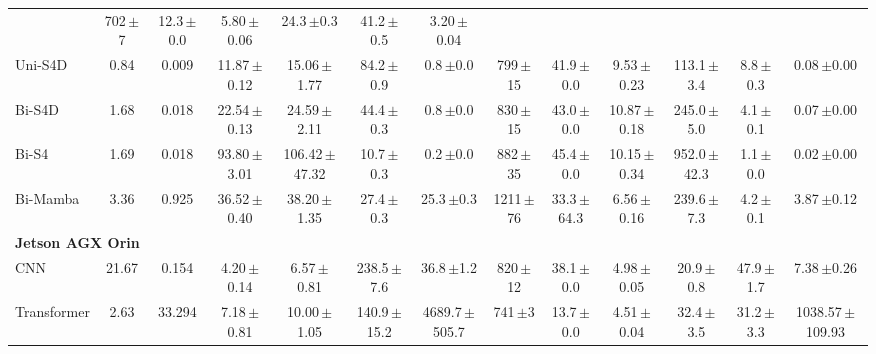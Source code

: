 \documentclass[sigconf,nonacm]{acmart}
\begin{document}
\begin{table}[t]
{\begin{tabular}{lcccccccccccc}
      & 702{\scriptsize\,$\pm$7} & 12.3{\scriptsize\,$\pm$0.0} & 5.80{\scriptsize\,$\pm$0.06}
      & 24.3{\scriptsize\,$\pm$0.3} & 41.2{\scriptsize\,$\pm$0.5} & 3.20{\scriptsize\,$\pm$0.04} \\
    Uni-S4D & 0.84 & 0.009
      & 11.87{\scriptsize\,$\pm$0.12} & 15.06{\scriptsize\,$\pm$1.77} & 84.2{\scriptsize\,$\pm$0.9} & 0.8{\scriptsize\,$\pm$0.0}
      & 799{\scriptsize\,$\pm$15} & 41.9{\scriptsize\,$\pm$0.0} & 9.53{\scriptsize\,$\pm$0.23}
      & 113.1{\scriptsize\,$\pm$3.4} & 8.8{\scriptsize\,$\pm$0.3} & 0.08{\scriptsize\,$\pm$0.00} \\
    Bi-S4D & 1.68 & 0.018
      & 22.54{\scriptsize\,$\pm$0.13} & 24.59{\scriptsize\,$\pm$2.11} & 44.4{\scriptsize\,$\pm$0.3} & 0.8{\scriptsize\,$\pm$0.0}
      & 830{\scriptsize\,$\pm$15} & 43.0{\scriptsize\,$\pm$0.0} & 10.87{\scriptsize\,$\pm$0.18}
      & 245.0{\scriptsize\,$\pm$5.0} & 4.1{\scriptsize\,$\pm$0.1} & 0.07{\scriptsize\,$\pm$0.00} \\
    Bi-S4 & 1.69 & 0.018
      & 93.80{\scriptsize\,$\pm$3.01} & 106.42{\scriptsize\,$\pm$47.32} & 10.7{\scriptsize\,$\pm$0.3} & 0.2{\scriptsize\,$\pm$0.0}
      & 882{\scriptsize\,$\pm$35} & 45.4{\scriptsize\,$\pm$0.0} & 10.15{\scriptsize\,$\pm$0.34}
      & 952.0{\scriptsize\,$\pm$42.3} & 1.1{\scriptsize\,$\pm$0.0} & 0.02{\scriptsize\,$\pm$0.00} \\
    Bi-Mamba & 3.36 & 0.925
      & 36.52{\scriptsize\,$\pm$0.40} & 38.20{\scriptsize\,$\pm$1.35} & 27.4{\scriptsize\,$\pm$0.3} & 25.3{\scriptsize\,$\pm$0.3}
      & 1211{\scriptsize\,$\pm$76} & 33.3{\scriptsize\,$\pm$64.3} & 6.56{\scriptsize\,$\pm$0.16}
      & 239.6{\scriptsize\,$\pm$7.3} & 4.2{\scriptsize\,$\pm$0.1} & 3.87{\scriptsize\,$\pm$0.12} \\
    \midrule
    \multicolumn{13}{l}{\textbf{Jetson AGX Orin}} \\
    CNN & 21.67 & 0.154
      & 4.20{\scriptsize\,$\pm$0.14} & 6.57{\scriptsize\,$\pm$0.81} & 238.5{\scriptsize\,$\pm$7.6} & 36.8{\scriptsize\,$\pm$1.2}
      & 820{\scriptsize\,$\pm$12} & 38.1{\scriptsize\,$\pm$0.0} & 4.98{\scriptsize\,$\pm$0.05}
      & 20.9{\scriptsize\,$\pm$0.8} & 47.9{\scriptsize\,$\pm$1.7} & 7.38{\scriptsize\,$\pm$0.26} \\
    Transformer & 2.63 & 33.294
      & 7.18{\scriptsize\,$\pm$0.81} & 10.00{\scriptsize\,$\pm$1.05} & 140.9{\scriptsize\,$\pm$15.2} & 4689.7{\scriptsize\,$\pm$505.7}
      & 741{\scriptsize\,$\pm$3} & 13.7{\scriptsize\,$\pm$0.0} & 4.51{\scriptsize\,$\pm$0.04}
      & 32.4{\scriptsize\,$\pm$3.5} & 31.2{\scriptsize\,$\pm$3.3} & 1038.57{\scriptsize\,$\pm$109.93} \\

\end{tabular}}
\end{table}
\end{document}
